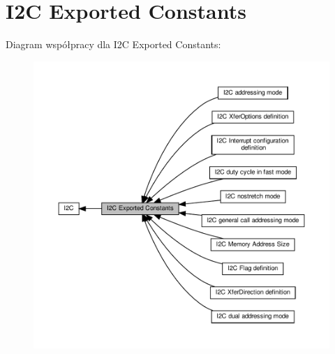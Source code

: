 \hypertarget{group___i2_c___exported___constants}{}\section{I2C Exported Constants}
\label{group___i2_c___exported___constants}
Diagram współpracy dla I2C Exported Constants\+:\nopagebreak
\begin{figure}[H]
\begin{center}
\leavevmode
\includegraphics[width=350pt]{group___i2_c___exported___constants}
\end{center}
\end{figure}
